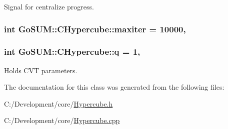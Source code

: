 Signal for centralize progress. 

\hypertarget{class_go_s_u_m_1_1_c_hypercube_a0e3ec089584a2c55fbc8db58b1e543ac}{
\subsubsection[{maxiter}]{\setlength{\rightskip}{0pt plus 5cm}int Go\-S\-U\-M\-::\-C\-Hypercube\-::maxiter = 10000\hspace{0.3cm}{\ttfamily [static]}, {\ttfamily [protected]}}}\label{class_go_s_u_m_1_1_c_hypercube_a0e3ec089584a2c55fbc8db58b1e543ac}
\hypertarget{class_go_s_u_m_1_1_c_hypercube_aecbeeb5c680a49beeebbc613242055d4}{
\subsubsection[{q}]{\setlength{\rightskip}{0pt plus 5cm}int Go\-S\-U\-M\-::\-C\-Hypercube\-::q = 1\hspace{0.3cm}{\ttfamily [static]}, {\ttfamily [protected]}}}\label{class_go_s_u_m_1_1_c_hypercube_aecbeeb5c680a49beeebbc613242055d4}


Holds C\-V\-T parameters. 



The documentation for this class was generated from the following files\-:\begin{DoxyCompactItemize}
\item 
C\-:/\-Development/core/\hyperlink{_hypercube_8h}{Hypercube.\-h}\item 
C\-:/\-Development/core/\hyperlink{_hypercube_8cpp}{Hypercube.\-cpp}\end{DoxyCompactItemize}
